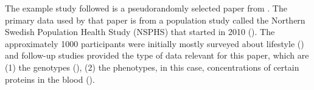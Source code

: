 The example study followed is a pseudorandomly selected paper
from \cite{ahsan2017relative}. The primary data used by that paper is
from a population study called the Northern Swedish Population
Health Study (NSPHS) that started in 2010 (\cite{igl2010northern}). 
The approximately 1000 participants were initially mostly surveyed
about lifestyle (\cite{igl2010northern}) and follow-up studies
provided the type of data relevant for this paper, 
which are (1) the genotypes (\cite{johansson2013identification}),
(2) the phenotypes, in this case, concentrations of certain proteins in the 
blood (\cite{enroth2014strong,enroth2015effect}).

